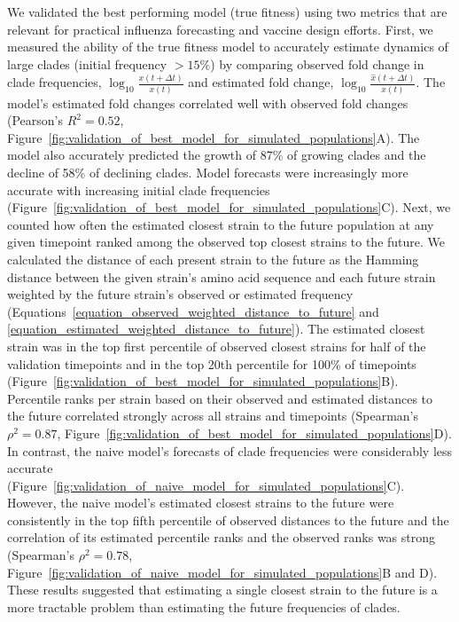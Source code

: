 We validated the best performing model (true fitness) using two metrics that are relevant for practical influenza forecasting and vaccine design efforts.
First, we measured the ability of the true fitness model to accurately estimate dynamics of large clades (initial frequency $>15\%$) by comparing observed fold change in clade frequencies, $\log_{10}{\frac{x(t + \Delta{t})}{x(t)}}$ and estimated fold change, $\log_{10}{\frac{\hat{x}(t + \Delta{t})}{x(t)}}$.
The model's estimated fold changes correlated well with observed fold changes (Pearson's $R^2 = 0.52$, Figure~\ref{fig:validation_of_best_model_for_simulated_populations}A).
The model also accurately predicted the growth of 87\% of growing clades and the decline of 58\% of declining clades.
Model forecasts were increasingly more accurate with increasing initial clade frequencies (Figure~\ref{fig:validation_of_best_model_for_simulated_populations}C).
Next, we counted how often the estimated closest strain to the future population at any given timepoint ranked among the observed top closest strains to the future.
We calculated the distance of each present strain to the future as the Hamming distance between the given strain's amino acid sequence and each future strain weighted by the future strain's observed or estimated frequency (Equations~\ref{equation_observed_weighted_distance_to_future} and \ref{equation_estimated_weighted_distance_to_future}).
The estimated closest strain was in the top first percentile of observed closest strains for half of the validation timepoints and in the top 20th percentile for 100\% of timepoints (Figure~\ref{fig:validation_of_best_model_for_simulated_populations}B).
Percentile ranks per strain based on their observed and estimated distances to the future correlated strongly across all strains and timepoints (Spearman's $\rho^2 = 0.87$, Figure~\ref{fig:validation_of_best_model_for_simulated_populations}D).
In contrast, the naive model's forecasts of clade frequencies were considerably less accurate (Figure~\ref{fig:validation_of_naive_model_for_simulated_populations}C).
However, the naive model's estimated closest strains to the future were consistently in the top fifth percentile of observed distances to the future and the correlation of its estimated percentile ranks and the observed ranks was strong (Spearman's $\rho^2 = 0.78$, Figure~\ref{fig:validation_of_naive_model_for_simulated_populations}B and D).
These results suggested that estimating a single closest strain to the future is a more tractable problem than estimating the future frequencies of clades.

